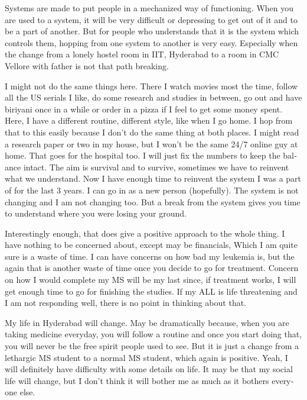\begin{english}
Systems are made to put people in a mechanized way of functioning. When you are used to a system,
it will be very difficult or depressing to get out of it and to be a part of another. But for people
who understands that it is the system which controls them, hopping from one system to another is very
easy. Especially when the change from a lonely hostel room in IIT, Hyderabad to a room in CMC 
Vellore with father is not that path breaking. 

I might not do the same things here. There I watch movies most the time, follow all the US serials
I like, do some research and studies in between, go out and have biriyani once in a while or order
in a pizza if I feel to get some money spent. Here, I have a different routine, different style, like 
when I go home. I hop from that to this easily because I don't do the same thing at both places.
I might read a research paper or two in my house, but I won't be the same 24/7 online guy at home.
That goes for the hospital too. I will just fix the numbers to keep the balance intact. The aim 
is survival and to survive, sometimes we have to reinvent what we understand. Now I have enough
time to reinvent the system I was a part of for the last 3 years. I can go in as a new person 
(hopefully). The system is not changing and I am not changing too. But a break from the system gives you time 
to understand where you were losing your ground.

Interestingly enough, that does give a positive approach to the whole thing. I have nothing to be 
concerned about, except may be financials, Which I am quite sure is a waste of time. I can have 
concerns on how bad my leukemia is, but the again that is another waste of time once you decide
to go for treatment. Concern on how I would complete my MS will be my last since, if treatment
works, I will get enough time to go for finishing the studies. If my ALL is life threatening
and I am not responding well, there is no point in thinking about that.

My life in Hyderabad will change. May be dramatically because, when you are taking medicine 
everyday, you will follow a routine and once you start doing that, you will never be the free
spirit people used to see. But it is just a change from a lethargic MS student to a normal 
MS student, which again is positive. Yeah, I will definitely have difficulty with some details 
on life. It may be that my social life will change, but I don't think it will bother me as much 
as it bothers everyone else.


\end{english}
